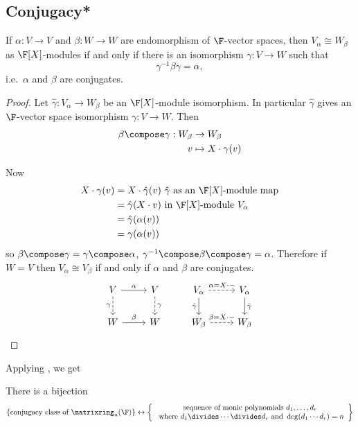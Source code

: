 \documentclass[a4paper]{article}
\theoremstyle{definition}
\begin{document}
\subsection{Conjugacy*}

\begin{lemma}
  If \(\alpha: V \to V\) and \(\beta: W \to W\) are endomorphism of \(\F\)-vector spaces, then \(V_\alpha \cong W_\beta\) as \(\F[X]\)-modules if and only if there is an isomorphism \(\gamma: V \to W\) such that
  \[
    \gamma^{-1} \beta \gamma = \alpha,
  \]
  i.e.\ \(\alpha\) and \(\beta\) are conjugates.
\end{lemma}

\begin{proof}
  Let \(\hat \gamma: V_\alpha \to W_\beta\) be an \(\F[X]\)-module isomorphism. In particular \(\hat \gamma\) gives an \(\F\)-vector space isomorphism \(\gamma: V \to W\). Then
  \begin{align*}
    \beta \compose \gamma: W_\beta &\to W_\beta \\
    v &\mapsto X \cdot \gamma(v)
  \end{align*}

  Now
  \begin{align*}
    X \cdot \gamma(v) &= X \cdot \hat \gamma(v) \text{ \(\hat \gamma\) as an \(\F[X]\)-module map} \\
                      &= \hat \gamma(X \cdot v) \text{ in \(\F[X]\)-module \(V_\alpha\)} \\
                      &= \hat \gamma(\alpha(v)) \\
                      &= \gamma(\alpha(v))
  \end{align*}
  so \(\beta \compose \gamma = \gamma \compose \alpha\), \(\gamma^{-1} \compose \beta \compose \gamma = \alpha\). Therefore if \(W = V\) then \(V_\alpha \cong V_\beta\) if and only if \(\alpha\) and \(\beta\) are conjugates.
  \[
    \begin{tikzcd}
      V \ar[r, "\alpha"] \ar[d, dashed, "\gamma"'] & V \ar[d, dashed, "\gamma"] & V_\alpha \ar[r, dashed, "\alpha = X \cdot -"] \ar[d, "\hat \gamma"'] & V_\alpha \ar[d, "\hat \gamma"] \\
      W \ar[r, "\beta"] & W & W_\beta \ar[r, dashed, "\beta = X \cdot -"] & W_\beta
    \end{tikzcd}
  \]
\end{proof}

Applying , we get

\begin{corollary}
  There is a bijection
  \[
    \{\text{conjugacy class of } \matrixring_n(\F)\} \leftrightarrow
    \left\{
    \begin{array}[h]{c}
      \text{sequence of monic polynomials } d_1, \dots, d_r \\
      \text{ where } d_1 \divides \cdots \divides d_r \text{ and } \deg (d_1 \cdots d_r) = n
    \end{array}
  \right\}
  \]
\end{corollary}
\end{document}

